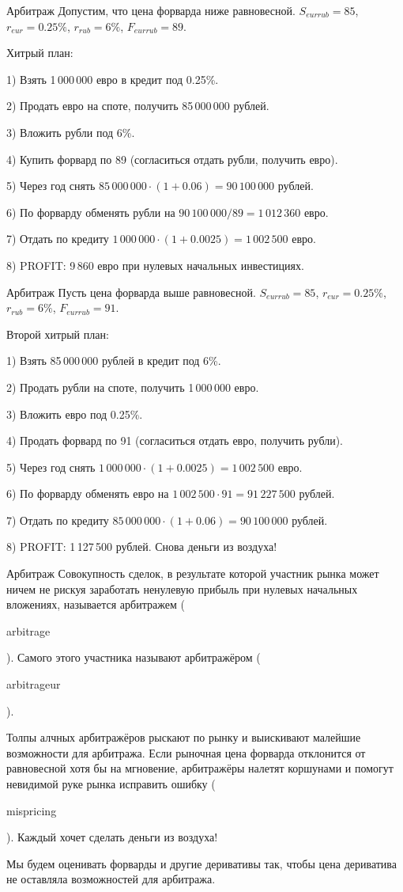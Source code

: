 \documentclass{beamer}
\newcommand{\en}[1]{\begin{otherlanguage}{english}#1\end{otherlanguage}}
\begin{document}
\begin{frame}{Арбитраж}
\justify
Допустим, что цена форварда ниже равновесной. $S_{eurrub}=85$, $r_{eur}=0.25\%$, $r_{rub}=6\%$, $F_{eurrub}=89$. 

\justify
Хитрый план:

1) Взять 1\,000\,000 евро в кредит под 0.25\%.

2) Продать евро на споте, получить 85\,000\,000 рублей.

3) Вложить рубли под 6\%.

4) Купить форвард по 89 (согласиться отдать рубли, получить евро).

5) Через год снять $85\,000\,000 \cdot (1+0.06) = 90\,100\,000$ рублей.

6) По форварду обменять рубли на $90\,100\,000 / 89 = 1\,012\,360$ евро.

7) Отдать по кредиту $1\,000\,000 \cdot (1 + 0.0025) = 1\,002\,500$ евро.

8) PROFIT: 9\,860 евро при нулевых начальных инвестициях.
\end{frame}



\begin{frame}{Арбитраж}
\justify
Пусть цена форварда выше равновесной. $S_{eurrub}=85$, $r_{eur}=0.25\%$, $r_{rub}=6\%$, $F_{eurrub}=91$. 

\justify
Второй хитрый план:

1) Взять 85\,000\,000 рублей в кредит под 6\%.

2) Продать рубли на споте, получить 1\,000\,000 евро.

3) Вложить евро под 0.25\%.

4) Продать форвард по 91 (согласиться отдать евро, получить рубли).

5) Через год снять $1\,000\,000 \cdot (1+0.0025) = 1\,002\,500$ евро.

6) По форварду обменять евро на $1\,002\,500 \cdot 91 = 91\,227\,500$ рублей.

7) Отдать по кредиту $85\,000\,000 \cdot (1 + 0.06) = 90\,100\,000$ рублей.

8) PROFIT: 1\,127\,500 рублей. Снова деньги из воздуха!
\end{frame}



\begin{frame}{Арбитраж}
\justify
Совокупность сделок, в результате которой участник рынка может ничем не рискуя заработать ненулевую прибыль при нулевых начальных вложениях, называется \alert{арбитражем} (\en{arbitrage}). Самого этого участника называют арбитражёром (\en{arbitrageur}).

\justify
Толпы алчных арбитражёров рыскают по рынку и выискивают малейшие возможности для арбитража. Если рыночная цена форварда отклонится от равновесной хотя бы на мгновение, арбитражёры налетят коршунами и помогут невидимой руке рынка исправить ошибку (\en{mispricing}). Каждый хочет сделать деньги из воздуха! 

\justify
Мы будем оценивать форварды и другие деривативы так, чтобы цена дериватива не оставляла возможностей для арбитража.
\end{frame}
\end{document}
